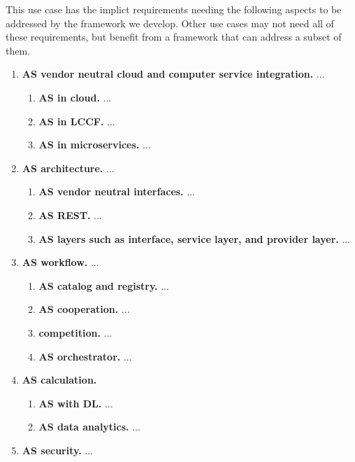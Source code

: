 

This use case has the implict requirements needing the following
aspects to be addressed by the framework we develop. Other use cases
may not need all of these requirements, but benefit from a framework
that can address a subset of them.

\begin{enumerate}

\item{\bf AS vendor neutral cloud and computer service integration.} ...

  \begin{enumerate}
  \item {\bf AS in cloud.} ...
  \item {\bf AS in LCCF.} ...
  \item {\bf AS in microservices.} ...
  \end{enumerate}

\item{\bf AS architecture.} ...

  \begin{enumerate}
  \item{\bf AS vendor neutral interfaces.} ...
  \item{\bf AS REST.} ...
  \item{\bf AS layers such as interface, service layer, and provider layer.} ...
  \end{enumerate}

\item{\bf AS workflow.} ...

  \begin{enumerate}
  \item{\bf AS catalog and registry.} ...
  \item{\bf AS cooperation.} ...
  \item{\bf competition.} ...
  \item{\bf AS orchestrator.} ...
  \end{enumerate}


\item{\bf AS calculation.}

  \begin{enumerate}
  \item{\bf AS with DL.} ...
  \item{\bf AS data analytics.} ...
  \end{enumerate}

\item{\bf AS security.} ...

\end{enumerate}


